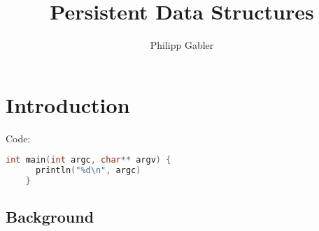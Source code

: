 \documentclass[12pt]{beamer}
\author{Philipp Gabler}
\title{Persistent Data Structures}
\date{}
\institute{}
\begin{document}
\beamertemplatenavigationsymbolsempty

\begin{frame}
  \maketitle
\end{frame}

\section{Introduction}

\begin{frame}[fragile]
  Code:
  \begin{lstlisting}[language = C]
    int main(int argc, char** argv) {
      println("%d\n", argc)
    }
  \end{lstlisting}
  
\end{frame}

\subsection{Background}
\end{document}
